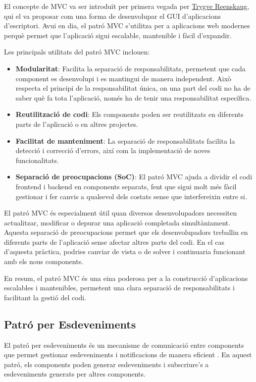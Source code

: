 \documentclass{ieeetj}
\begin{document}
El concepte de MVC va ser introduït per primera vegada per  \href{https://en.wikipedia.org/wiki/Trygve_Reenskaug}{Trygve Reenskaug}, qui el va proposar com una forma de desenvolupar el GUI d'aplicacions d'escriptori. Avui en dia, el patró MVC s'utilitza per a aplicacions web modernes perquè permet que l'aplicació sigui escalable, mantenible i fàcil d'expandir.

Les principals utilitats del patró MVC inclouen: 
\begin{itemize} 
    \item \textbf{Modularitat}: Facilita la separació de responsabilitats, permetent que cada component es desenvolupi i es mantingui de manera independent. Això respecta el principi de la responsabilitat única, on una part del codi no ha de saber què fa tota l'aplicació, només ha de tenir una responsabilitat específica.
    \item \textbf{Reutilització de codi}: Els components poden ser reutilitzats en diferents parts de l'aplicació o en altres projectes.
    \item \textbf{Facilitat de manteniment}: La separació de responsabilitats facilita la detecció i correcció d'errors, així com la implementació de noves funcionalitats.
    \item \textbf{Separació de preocupacions (SoC)}: El patró MVC ajuda a dividir el codi frontend i backend en components separats, fent que sigui molt més fàcil gestionar i fer canvis a qualsevol dels costats sense que interfereixin entre si.
\end{itemize}

El patró MVC és especialment útil quan diversos desenvolupadors necessiten actualitzar, modificar o depurar una aplicació completada simultàniament. Aquesta separació de preocupacions permet que els desenvolupadors treballin en diferents parts de l'aplicació sense afectar altres parts del codi. En el cas d'aquesta pràctica, podries canviar de vista o de solver i continuaria funcionant amb els nous components.

En resum, el patró MVC és una eina poderosa per a la construcció d'aplicacions escalables i mantenibles, permetent una clara separació de responsabilitats i facilitant la gestió del codi.

\subsection{Patró per Esdeveniments} 
El patró per esdeveniments és un mecanisme de comunicació entre components que permet gestionar esdeveniments i notificacions de manera eficient \cite{EventPattern}. En aquest patró, els components poden generar esdeveniments i subscriure's a esdeveniments generats per altres components.
\end{document}
